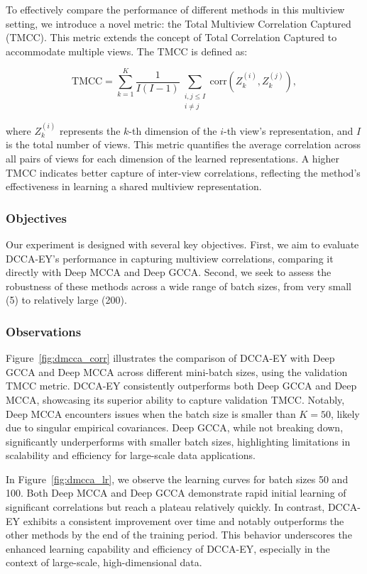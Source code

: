 To effectively compare the performance of different methods in this multiview setting, we introduce a novel metric: the Total Multiview Correlation Captured (TMCC). This metric extends the concept of Total Correlation Captured to accommodate multiple views. The TMCC is defined as:

\[
    \text{TMCC} = \sum_{k=1}^{K} \frac{1}{I(I-1)} \sum_{\substack{i,j \leq I \\ i \neq j}} \text{corr}(Z_k^{(i)}, Z_k^{(j)}),
\]

where \( Z_k^{(i)} \) represents the \( k \)-th dimension of the \( i \)-th view's representation, and $I$ is the total number of views. This metric quantifies the average correlation across all pairs of views for each dimension of the learned representations. A higher TMCC indicates better capture of inter-view correlations, reflecting the method's effectiveness in learning a shared multiview representation.

\subsubsection{Objectives}

Our experiment is designed with several key objectives. First, we aim to evaluate DCCA-EY's performance in capturing multiview correlations, comparing it directly with Deep MCCA and Deep GCCA. Second, we seek to assess the robustness of these methods across a wide range of batch sizes, from very small (5) to relatively large (200).

\subsubsection{Observations}
Figure~\ref{fig:dmcca_corr} illustrates the comparison of DCCA-EY with Deep GCCA and Deep MCCA across different mini-batch sizes, using the validation TMCC metric.
DCCA-EY consistently outperforms both Deep GCCA and Deep MCCA, showcasing its superior ability to capture validation TMCC. Notably, Deep MCCA encounters issues when the batch size is smaller than $K=50$, likely due to singular empirical covariances.
Deep GCCA, while not breaking down, significantly underperforms with smaller batch sizes, highlighting limitations in scalability and efficiency for large-scale data applications.

In Figure~\ref{fig:dmcca_lr}, we observe the learning curves for batch sizes 50 and 100. Both Deep MCCA and Deep GCCA demonstrate rapid initial learning of significant correlations but reach a plateau relatively quickly. In contrast, DCCA-EY exhibits a consistent improvement over time and notably outperforms the other methods by the end of the training period. This behavior underscores the enhanced learning capability and efficiency of DCCA-EY, especially in the context of large-scale, high-dimensional data.

